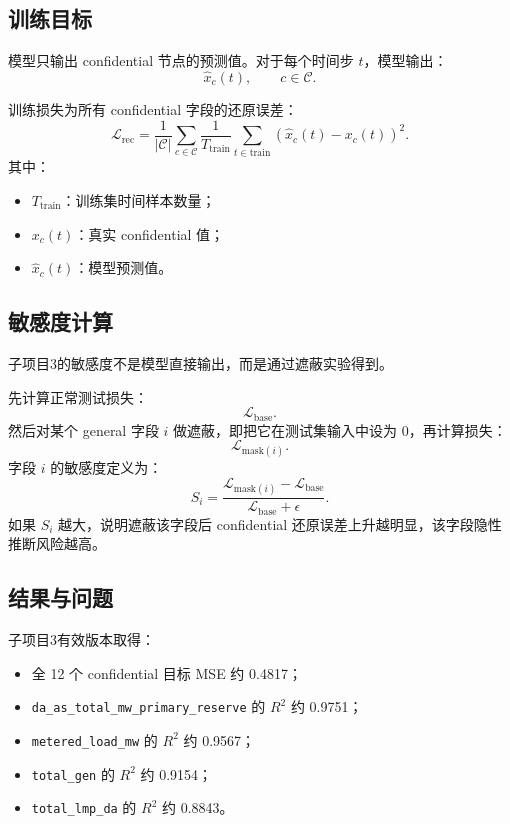 \documentclass[UTF8]{ctexart}
\begin{document}
\subsection{训练目标}

模型只输出 confidential 节点的预测值。对于每个时间步 \(t\)，模型输出：
\[
\hat{x}_c(t),\qquad c\in\mathcal{C}.
\]

训练损失为所有 confidential 字段的还原误差：
\[
\mathcal{L}_{\text{rec}}
=
\frac{1}{|\mathcal{C}|}
\sum_{c\in\mathcal{C}}
\frac{1}{T_{\text{train}}}
\sum_{t\in\text{train}}
(\hat{x}_c(t)-x_c(t))^2.
\]
其中：
\begin{itemize}
    \item \(T_{\text{train}}\)：训练集时间样本数量；
    \item \(x_c(t)\)：真实 confidential 值；
    \item \(\hat{x}_c(t)\)：模型预测值。
\end{itemize}

\subsection{敏感度计算}

子项目3的敏感度不是模型直接输出，而是通过遮蔽实验得到。

先计算正常测试损失：
\[
\mathcal{L}_{\text{base}}.
\]
然后对某个 general 字段 \(i\) 做遮蔽，即把它在测试集输入中设为 0，再计算损失：
\[
\mathcal{L}_{\text{mask}(i)}.
\]
字段 \(i\) 的敏感度定义为：
\[
S_i
=
\frac{
\mathcal{L}_{\text{mask}(i)}
-
\mathcal{L}_{\text{base}}
}{
\mathcal{L}_{\text{base}}+\epsilon
}.
\]
如果 \(S_i\) 越大，说明遮蔽该字段后 confidential 还原误差上升越明显，该字段隐性推断风险越高。

\subsection{结果与问题}

子项目3有效版本取得：
\begin{itemize}
    \item 全 12 个 confidential 目标 MSE 约 0.4817；
    \item \texttt{da\_as\_total\_mw\_primary\_reserve} 的 \(R^2\) 约 0.9751；
    \item \texttt{metered\_load\_mw} 的 \(R^2\) 约 0.9567；
    \item \texttt{total\_gen} 的 \(R^2\) 约 0.9154；
    \item \texttt{total\_lmp\_da} 的 \(R^2\) 约 0.8843。
\end{itemize}
\end{document}
